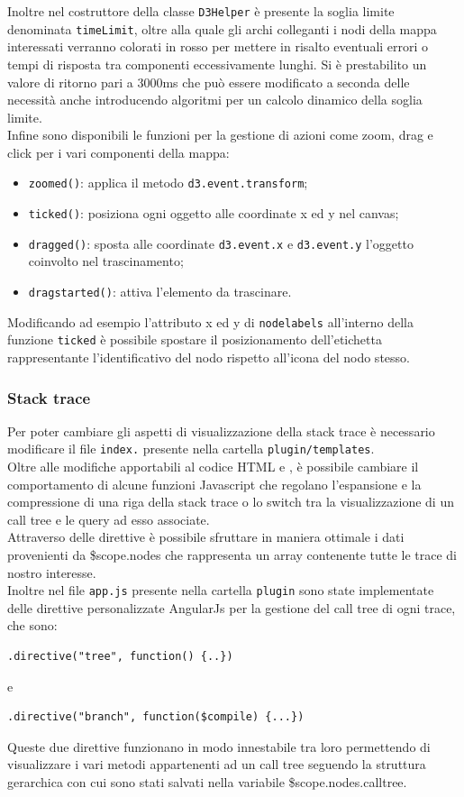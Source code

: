 Inoltre nel costruttore della classe \texttt{D3Helper} è presente la soglia limite denominata \texttt{timeLimit}, oltre alla quale gli archi colleganti i nodi della mappa interessati verranno colorati in rosso per mettere in risalto eventuali errori o tempi di risposta tra componenti eccessivamente lunghi.
Si è prestabilito un valore di ritorno pari a 3000ms che può essere modificato a seconda delle necessità anche introducendo algoritmi per un calcolo dinamico della soglia limite. \\
Infine sono disponibili le funzioni per la gestione di azioni come zoom, drag e click per i vari componenti della mappa:
\begin{itemize}
	\item \texttt{zoomed()}: applica il metodo \texttt{d3.event.transform};
	\item \texttt{ticked()}: posiziona ogni oggetto alle coordinate x ed y nel canvas;
	\item \texttt{dragged()}: sposta alle coordinate \texttt{d3.event.x} e \texttt{d3.event.y} l'oggetto coinvolto nel trascinamento;
	\item \texttt{dragstarted()}: attiva l'elemento da trascinare.
\end{itemize}
Modificando ad esempio l'attributo x ed y di \texttt{nodelabels} all'interno della funzione \texttt{ticked} è possibile spostare il posizionamento dell'etichetta rappresentante l'identificativo del nodo rispetto all'icona del nodo stesso.\\

\subsubsection{Stack trace}
\label{sec:stack}
Per poter cambiare gli aspetti di visualizzazione della stack trace è necessario modificare il file \texttt{index.} presente nella cartella \texttt{plugin/templates}.\\
Oltre alle modifiche apportabili al codice HTML e , è possibile cambiare il comportamento di alcune funzioni Javascript che regolano l'espansione e la compressione di una riga della stack trace o lo switch tra la visualizzazione di un call tree e le query ad esso associate.\\
Attraverso delle direttive  è possibile sfruttare in maniera ottimale i dati provenienti da \$scope.nodes che rappresenta un array contenente tutte le trace di nostro interesse.\\
Inoltre nel file \texttt{app.js} presente nella cartella \texttt{plugin} sono state implementate delle direttive personalizzate AngularJs per la gestione del call tree di ogni trace, che sono:
\begin{lstlisting}
.directive("tree", function() {..})
\end{lstlisting}
e
\begin{lstlisting}
.directive("branch", function($compile) {...})
\end{lstlisting}
Queste due direttive funzionano in modo innestabile tra loro permettendo di visualizzare i vari metodi appartenenti ad un call tree seguendo la struttura gerarchica con cui sono stati salvati nella variabile \$scope.nodes.calltree.

